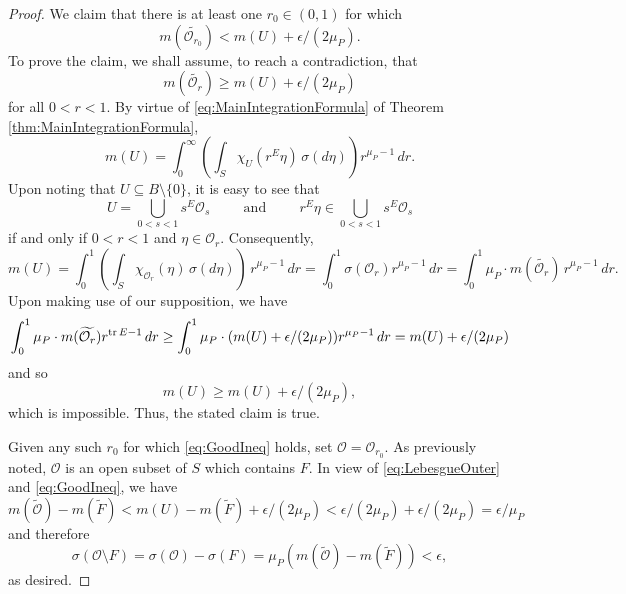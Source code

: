 \documentclass[11pt]{article}
\theoremstyle{remark}
\begin{document}
\begin{proof}
We claim that there is at least one $r_0\in (0,1)$ for which 
\begin{equation}\label{eq:GoodIneq}
m(\widetilde{\mathcal{O}_{r_0}})< m(U)+\epsilon/(2\mu_P).
\end{equation}
To prove the claim, we shall assume, to reach a contradiction, that 
\begin{equation*}
m(\widetilde{\mathcal{O}_{r}})\geq m(U)+\epsilon/(2\mu_P)
\end{equation*}
for all $0<r<1$. By virtue of \eqref{eq:MainIntegrationFormula} of Theorem \ref{thm:MainIntegrationFormula},
\begin{equation*}
m(U)=\int_{0}^\infty\left(\int_S \chi_{U}(r^E\eta)\,\sigma(d\eta)\right)r^{\mu_P-1}\,dr.
\end{equation*}
Upon noting that $U\subseteq B\setminus\{0\}$, it is easy to see that
\begin{equation*}
U=\bigcup_{0<s<1}s^E\mathcal{O}_s
\hspace{1cm}\mbox{and}\hspace{1cm}
r^E\eta\in \bigcup_{0<s<1}s^E\mathcal{O}_s
\end{equation*}
if and only if $0<r<1$ and $\eta\in \mathcal{O}_r$. Consequently,
\begin{equation*}
m(U)=\int_0^1\left(\int_S\chi_{\mathcal{O}_r}(\eta)\,\sigma(d\eta)\right)\,r^{\mu_P-1}\,dr=\int_0^1\sigma(\mathcal{O}_r)r^{\mu_P-1}\,dr=\int_0^1 \mu_P\cdot m(\widetilde{\mathcal{O}_r})\,r^{\mu_P-1}\,dr.
\end{equation*}
Upon making use of our supposition, we have
\begin{equation*}
\int_0^1\mu_P\cdot m(\widetilde{\mathcal{O}_r})r^{\tr E-1}\,dr\geq \int_0^1\mu_P\cdot (m(U)+\epsilon/(2\mu_P))r^{\mu_P-1}\,dr=m(U)+\epsilon/(2\mu_P)
\end{equation*}
and so
\begin{equation*}
m(U)\geq m(U)+\epsilon/(2\mu_P),
\end{equation*}
which is impossible. Thus, the stated claim is true.

Given any such $r_0$ for which \eqref{eq:GoodIneq} holds, set $\mathcal{O}=\mathcal{O}_{r_0}$. As previously noted, $\mathcal{O}$ is an open subset of $S$ which contains $F$. In view of \eqref{eq:LebesgueOuter} and \eqref{eq:GoodIneq}, we have
\begin{equation*}
m(\widetilde{\mathcal{O}})-m(\widetilde{F})<m(U)-m(\widetilde{F})+\epsilon/(2\mu_P)<\epsilon/(2\mu_P)+\epsilon/(2\mu_P)=\epsilon/\mu_P
\end{equation*}
and therefore
\begin{equation*}
\sigma(\mathcal{O}\setminus F)=\sigma(\mathcal{O})-\sigma(F)=\mu_P(m(\widetilde{\mathcal{O}})-m(\widetilde{F}))<\epsilon,
\end{equation*}
as desired.
\end{proof}
\end{document}
